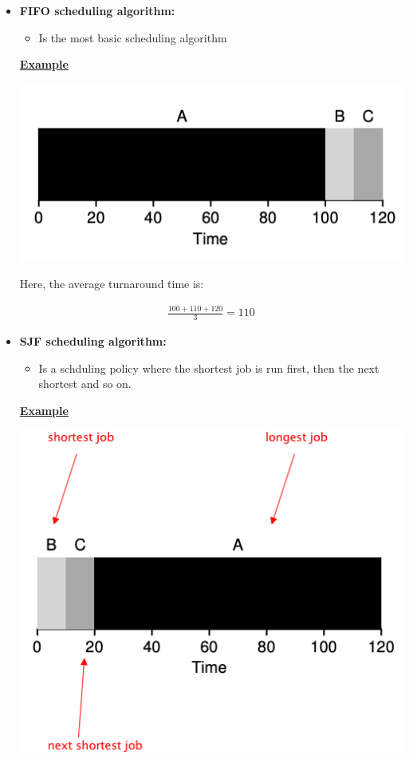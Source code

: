 \documentclass[12pt]{article}
\begin{document}
\begin{enumerate}[1.]
\begin{itemize}
        \item \textbf{FIFO scheduling algorithm:}

        \begin{itemize}
            \item Is the most basic scheduling algorithm
        \end{itemize}

        \bigskip

        \underline{\textbf{Example}}

        \begin{center}
        \includegraphics[width=0.6\linewidth]{images/worksheet_4_solution_2.png}
        \end{center}

        \bigskip

        Here, the average turnaround time is:

        \begin{align}
            \frac{100 + 110 + 120}{3} = 110
        \end{align}

        \item \textbf{SJF scheduling algorithm:}

        \begin{itemize}
            \item Is a schduling policy where the shortest job is run first, then the next shortest and so on.
        \end{itemize}

        \bigskip

        \underline{\textbf{Example}}

        \begin{center}
        \includegraphics[width=0.6\linewidth]{images/worksheet_4_solution_1.png}
        \end{center}


\end{itemize}
\end{enumerate}
\end{document}
